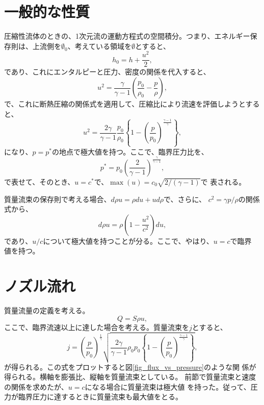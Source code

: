 \section{一般的な性質}
圧縮性流体のときの、1次元流の運動方程式の空間積分。つまり、エネルギー保
存則は、上流側を$\emptyset_0$、考えている領域を$\emptyset$とすると、
\begin{equation}
 h_0 = h + \frac{u^2}{2},
\end{equation}
であり、これにエンタルピーと圧力、密度の関係を代入すると、
\begin{equation}
 u^2 = \frac{\gamma}{\gamma - 1}\left(
				 \frac{p_0}{\rho_0} - \frac{p}{\rho}\right),
\end{equation}
で、これに断熱圧縮の関係式を適用して、圧縮比により流速を評価しようとする
と、
\begin{equation}
 u^2 = \frac{2\gamma}{\gamma - 1}\frac{p_0}{\rho_0}
  \left\{1 - \left(\frac{p}{p_0}\right)^{\frac{\gamma - 1}{\gamma}}\right\},
\end{equation}
になり、$p=p^*$の地点で極大値を持つ。ここで、臨界圧力比を、
\begin{equation}
 p^* = p_0 \left(\frac{2}{\gamma - 1}\right)^{\frac{\gamma}{\gamma - 1}},
\end{equation}
で表せて、そのとき、$u=c^*$で、$\max (u) = c_0 \sqrt{2/(\gamma - 1)}$で
表される。

質量流束の保存則で考える場合、$d\rho u = \rho du + ud\rho$で、さらに、
$c^2=\gamma p/\rho$の関係式から、
\begin{equation}
 d\rho u = \rho \left(1 - \frac{u^2}{c^2}\right)du,
\end{equation}
であり、$u/c$について極大値を持つことが分る。ここで、やはり、$u=c$で臨界
値を持つ。

\section{ノズル流れ}
質量流量の定義を考える。
\begin{equation}
 Q = S \rho u,
\end{equation}
ここで、臨界流速以上に達した場合を考える。質量流束を$j$とすると、
\begin{equation}
 j = \left(\frac{p}{p_0}\right)^{\frac{1}{\gamma}}
  \sqrt{\frac{2\gamma}{\gamma - 1}\rho_0 p_0
 \left\{1-\left(\frac{p}{p_0}\right)^{\frac{\gamma-1}{\gamma}}\right\}},
\end{equation}
が得られる。この式をプロットすると図\ref{fig_flux_vs_pressure}のような関
係が得られる。横軸を膨張比、縦軸を質量流束としている。
前節で質量流束と速度の関係を求めたが、$u=c$になる場合に質量流束は極大値
を持った。従って、圧力が臨界圧力に達するときに質量流束も最大値をとる。

